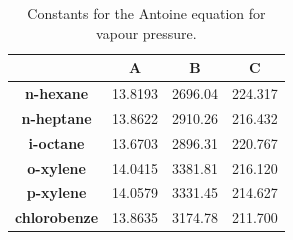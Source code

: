 \documentclass[12pts,a4paper,amsmath,amssymb,floatfix]{article}%
\begin{document}
\begin{enumerate}[label=\bfseries Problem \arabic*:]
\begin{table}[h]
\begin{center}
\begin{tabular}{||c | c c c ||} 
\hline\hline
                           & {\bf A}    &  {\bf B}    & {\bf C}    \\
\hline
{\bf n-hexane}             & 13.8193    & 2696.04     & 224.317    \\  
{\bf n-heptane}            & 13.8622    & 2910.26     & 216.432    \\  
{\bf i-octane}             & 13.6703    & 2896.31     & 220.767    \\  
{\bf o-xylene}             & 14.0415    & 3381.81     & 216.120    \\  
{\bf p-xylene}             & 14.0579    & 3331.45     & 214.627    \\  
{\bf chlorobenze}           & 13.8635    & 3174.78     & 211.700    \\  
\hline\hline
\end{tabular}
\caption{Constants for the Antoine equation for vapour pressure.}
\label{Practical1:Table2}
\end{center}
\end{table}




\end{enumerate}
\clearpage
\end{document}
